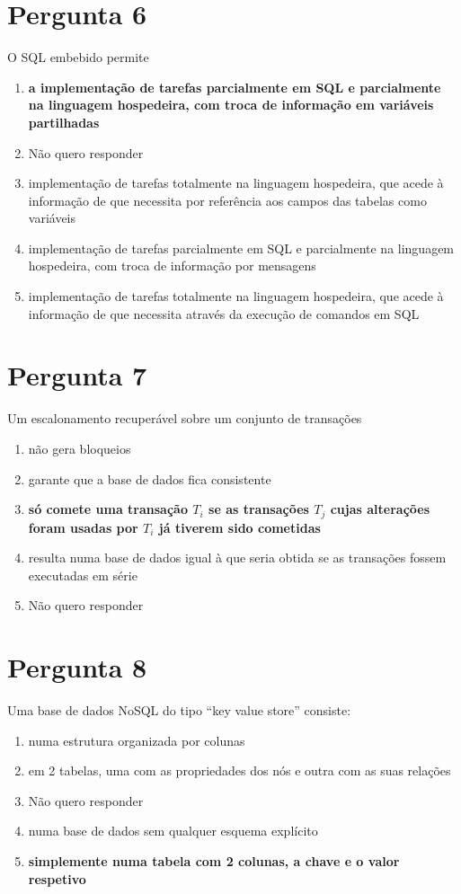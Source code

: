{\section{Pergunta 6}
O SQL embebido permite
\begin{enumerate}[label=\alph*.]\itemsep0em
    \item \textbf{a implementação de tarefas parcialmente em SQL e parcialmente na linguagem hospedeira, com troca de informação em variáveis partilhadas \greencheckmark}
    \item Não quero responder
    \item implementação de tarefas totalmente na linguagem hospedeira, que acede à informação de que necessita por referência aos campos das tabelas como variáveis
    \item implementação de tarefas parcialmente em SQL e parcialmente na linguagem hospedeira, com troca de informação por mensagens
    \item implementação de tarefas totalmente na linguagem hospedeira, que acede à informação de que necessita através da execução de comandos em SQL
\end{enumerate}

\section{Pergunta 7}
Um escalonamento recuperável sobre um conjunto de transações
\begin{enumerate}[label=\alph*.]\itemsep0em
    \item não gera bloqueios
    \item garante que a base de dados fica consistente
    \item \textbf{só comete uma transação $T_i$ se as transações $T_j$ cujas alterações foram usadas por $T_i$ já tiverem sido cometidas \greencheckmark}
    \item resulta numa base de dados igual à que seria obtida se as transações fossem executadas em série
    \item Não quero responder
\end{enumerate}

\section{Pergunta 8}
Uma base de dados NoSQL do tipo ``key value store'' consiste:
\begin{enumerate}[label=\alph*.]\itemsep0em
    \item numa estrutura organizada por colunas
    \item em 2 tabelas, uma com as propriedades dos nós e outra com as suas relações
    \item Não quero responder
    \item numa base de dados sem qualquer esquema explícito
    \item \textbf{simplemente numa tabela com 2 colunas, a chave e o valor respetivo \greencheckmark}
\end{enumerate}

}
